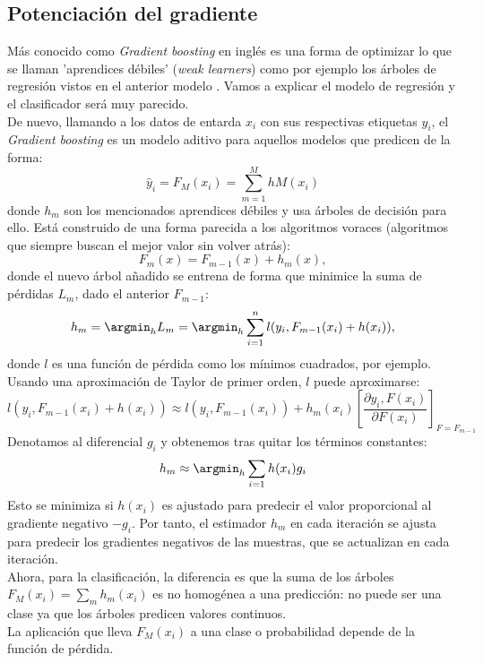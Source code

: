 \subsection{Potenciación del gradiente}
Más conocido como \textit{Gradient boosting} en inglés es una forma de optimizar lo que se llaman 'aprendices débiles' (\textit{weak learners}) como por ejemplo los árboles de regresión vistos en el anterior modelo  \cite{scikit2021gb}. Vamos a explicar el modelo de regresión y el clasificador será muy parecido.\\
De nuevo, llamando a los datos de entarda $x_i$ con sus respectivas etiquetas $y_i$, el \textit{Gradient boosting} es un modelo aditivo para aquellos modelos que predicen de la forma:
\[ \hat{y}_i = F_M(x_i)=\sum_{m=1}^M hM(x_i) \]
donde $h_m$ son los mencionados aprendices débiles y usa árboles de decisión para ello. Está construido de una forma parecida a los algoritmos voraces (algoritmos que siempre buscan el mejor valor sin volver atrás):
\[ F_m(x)=F_{m-1}(x)+ h_m(x), \]
donde el nuevo árbol añadido se entrena de forma que minimice la suma de pérdidas $L_m$, dado el anterior $F_{m-1}$:
\[ h_m=\argmin_h L_m=\argmin_h \sum_{i=1}^n l(y_i,F_{m-1}(x_i)+h(x_i)), \]
donde $l$ es una función de pérdida como los mínimos cuadrados, por ejemplo.\\
Usando una aproximación de Taylor de primer orden, $l$ puede aproximarse:
\[ l(y_i,F_{m-1}(x_i)+h(x_i)) \approx l(y_i,F_{m-1}(x_i)) + h_m(x_i) \left[ \frac{\partial y_i, F(x_i)}{\partial F(x_i)} \right]_{F=F_{m-1}} \]
Denotamos al diferencial $g_i$ y obtenemos tras quitar los términos constantes:
\[ h_m \approx \argmin_h \sum_{i=1} h(x_i)g_i \]
Esto se minimiza si $h(x_i)$ es ajustado para predecir el valor proporcional al gradiente negativo $-g_i$. Por tanto, el estimador $h_m$ en cada iteración se ajusta para predecir los gradientes negativos de las muestras, que se actualizan en cada iteración.\\
Ahora, para la clasificación, la diferencia es que la suma de los árboles $F_M(x_i)=\sum_m h_m (x_i)$ es no homogénea a una predicción: no puede ser una clase ya que los árboles predicen valores continuos.\\
La aplicación que lleva $F_M(x_i)$ a una clase o probabilidad depende de la función de pérdida. \cite{scikit2021gb}

